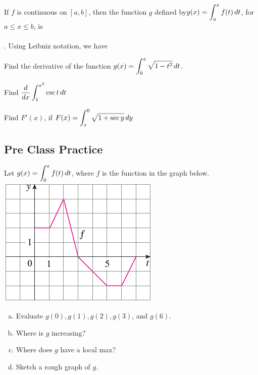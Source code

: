 \documentclass[notes]{subfiles}
\begin{document}
		\begin{thm}
				If \(f\) is continuous on \([a,b]\), then the function \(g\) defined by\(g(x) = \displaystyle \int_a^x f(t)\,dt\), for \(a\leq x\leq b\), is\vspace{25pt} \\ \\ .  Using Leibniz notation, we have\vspace{.75in}
			
		\end{thm}
			\newpage
			
		\begin{ex}
			Find the derivative of the function \(g(x) = \displaystyle\int_0^x \sqrt{1-t^2}\,dt\).	
		\end{ex}
		\begin{ex}
			Find \(\displaystyle\dfrac{d}{dx}\int_1^{x^2}\csc t\,dt\)
		\end{ex}
		
		\begin{ex}
			Find \(F'(x)\), if \(F(x) = \displaystyle \int_x^0 \sqrt{1 + \sec y}\, dy\)
		\end{ex}
			\newpage

	\subsection*{Pre Class Practice}
		\begin{ex}
			Let \(g(x) = \displaystyle \int_0^x f(t)\, dt\), where \(f\) is the function in the graph below.\\
			\includegraphics{5.3fig1}\\
			\begin{enumerate}[(a)]
				\item Evaluate \(g(0), g(1), g(2), g(3)\), and \(g(6)\).
					
				\item Where is \(g\) increasing?
					
				\item Where does \(g\) have a local max?
					
				\item Sketch a rough graph of \(g\).
					
			\end{enumerate}
		\end{ex}	
			\newpage
		
\end{document}
